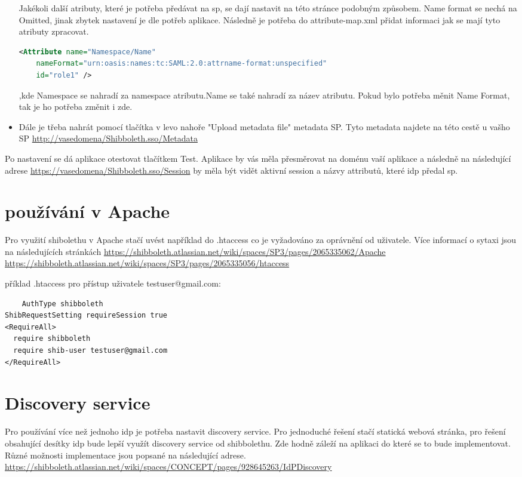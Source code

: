 \begin{itemize}
Jakékoli další atributy, které je potřeba předávat na sp, se dají nastavit na této stránce podobným způsobem. Name format se nechá na Omitted, jinak zbytek nastavení je dle potřeb aplikace. Následně je potřeba do attribute-map.xml přidat informaci jak se mají tyto atributy zpracovat.
   \begin{lstlisting}[language=XML]
     <Attribute name="Namespace/Name"
    nameFormat="urn:oasis:names:tc:SAML:2.0:attrname-format:unspecified"
    id="role1" />
    \end{lstlisting}
,kde Namespace se nahradí za namespace atributu.Name se také nahradí za název atributu. Pokud bylo potřeba měnit Name Format, tak je ho potřeba změnit i zde.
    


    \item Dále je třeba nahrát pomocí tlačítka v levo nahoře "Upload metadata file" metadata SP. Tyto metadata najdete na této cestě u vašho SP \url{http://vasedomena/Shibboleth.sso/Metadata}

\end{itemize}

Po nastavení se dá aplikace otestovat tlačítkem Test. Aplikace by vás měla přesměrovat na doménu vaší aplikace a následně na následující adrese \url{https://vasedomena/Shibboleth.sso/Session} by měla být vidět aktivní session a názvy attributů, které idp předal sp.

\section{používání v Apache}

Pro využití shibolethu v Apache stačí uvést například do .htaccess co je vyžadováno za oprávnění od uživatele. Více informací o sytaxi jsou na následujících stránkách 
\url{https://shibboleth.atlassian.net/wiki/spaces/SP3/pages/2065335062/Apache}
\url{https://shibboleth.atlassian.net/wiki/spaces/SP3/pages/2065335056/htaccess}

příklad .htaccess pro přístup uživatele testuser@gmail.com:

 \begin{lstlisting}
    AuthType shibboleth
ShibRequestSetting requireSession true
<RequireAll>
  require shibboleth
  require shib-user testuser@gmail.com
</RequireAll>
    \end{lstlisting}


\section{Discovery service}
Pro používání více než jednoho idp je potřeba nastavit discovery service. Pro jednoduché řešení stačí statická webová stránka, pro řešení obsahující desítky idp bude lepší využít discovery service od shibbolethu. Zde hodně záleží na aplikaci do které se to bude implementovat. Různé možnosti implementace jsou popsané na následující adrese. 
\url{https://shibboleth.atlassian.net/wiki/spaces/CONCEPT/pages/928645263/IdPDiscovery}
